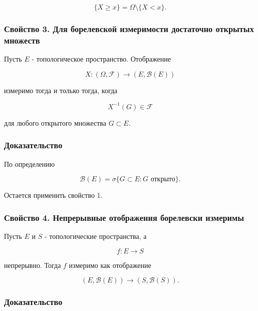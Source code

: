 \documentclass[
  11pt,
  a4paper,
]{article}
\begin{document}
\[
\{X\ge x\}=\Omega\setminus\{X<x\}.
\]

\subsubsection{Свойство 3. Для борелевской измеримости достаточно
открытых
множеств}\label{ux441ux432ux43eux439ux441ux442ux432ux43e-3.-ux434ux43bux44f-ux431ux43eux440ux435ux43bux435ux432ux441ux43aux43eux439-ux438ux437ux43cux435ux440ux438ux43cux43eux441ux442ux438-ux434ux43eux441ux442ux430ux442ux43eux447ux43dux43e-ux43eux442ux43aux440ux44bux442ux44bux445-ux43cux43dux43eux436ux435ux441ux442ux432}

Пусть \(E\) - топологическое пространство. Отображение

\[
X:(\Omega,\mathcal F)\to(E,\mathcal B(E))
\]

измеримо тогда и только тогда, когда

\[
X^{-1}(G)\in\mathcal F
\]

для любого открытого множества \(G\subset E\).

\subsubsection{Доказательство}\label{ux434ux43eux43aux430ux437ux430ux442ux435ux43bux44cux441ux442ux432ux43e-1}

По определению

\[
\mathcal B(E)=\sigma\{G\subset E:G\text{ открыто}\}.
\]

Остается применить свойство 1.

\subsubsection{Свойство 4. Непрерывные отображения борелевски
измеримы}\label{ux441ux432ux43eux439ux441ux442ux432ux43e-4.-ux43dux435ux43fux440ux435ux440ux44bux432ux43dux44bux435-ux43eux442ux43eux431ux440ux430ux436ux435ux43dux438ux44f-ux431ux43eux440ux435ux43bux435ux432ux441ux43aux438-ux438ux437ux43cux435ux440ux438ux43cux44b}

Пусть \(E\) и \(S\) - топологические пространства, а

\[
f:E\to S
\]

непрерывно. Тогда \(f\) измеримо как отображение

\[
(E,\mathcal B(E))\to(S,\mathcal B(S)).
\]

\subsubsection{Доказательство}\label{ux434ux43eux43aux430ux437ux430ux442ux435ux43bux44cux441ux442ux432ux43e-2}
\end{document}
